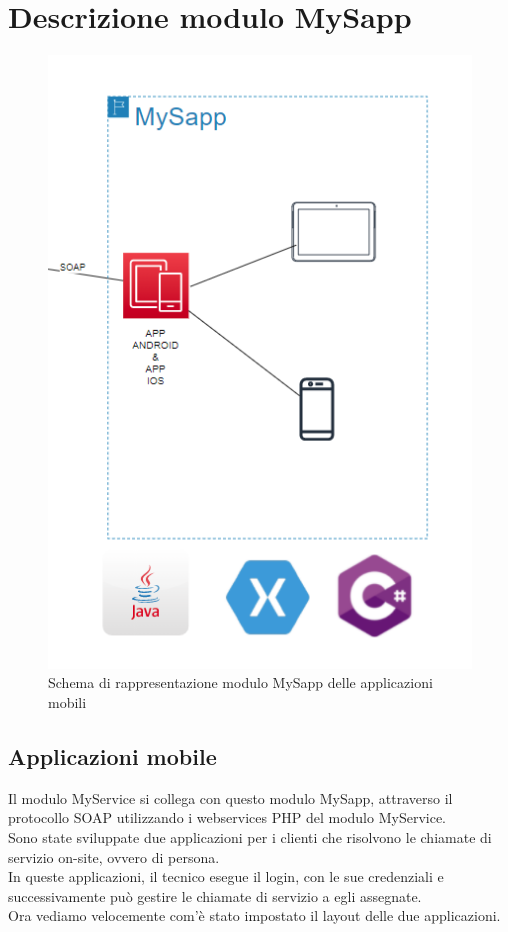 \section{Descrizione modulo MySapp}
\begin{figure}[!h] 
	\centering 
	\includegraphics[scale = 1.1]{immagini/modulo-mysapp.png} 
	\caption{Schema di rappresentazione modulo MySapp delle applicazioni mobili}
\end{figure}
\newpage
\subsection{Applicazioni mobile}
Il modulo MyService si collega con questo modulo MySapp, attraverso il protocollo SOAP utilizzando i webservices PHP del modulo MyService.\\
Sono state sviluppate due applicazioni per i clienti che risolvono le chiamate di servizio on-site, ovvero di persona.\\
In queste applicazioni, il tecnico esegue il login, con le sue credenziali e successivamente può gestire le chiamate di servizio a egli assegnate.\\
Ora vediamo velocemente com'è stato impostato il layout delle due applicazioni.
